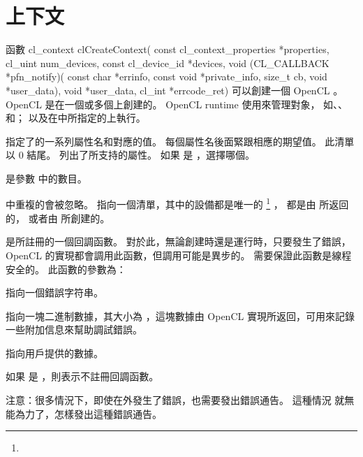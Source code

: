 \section{上下文}
函數
\startclc
cl_context clCreateContext(
		const cl_context_properties *properties,
		cl_uint num_devices,
		const cl_device_id *devices,
		void (CL_CALLBACK *pfn_notify)(
			const char *errinfo,
			const void *private_info,
			size_t cb,
			void *user_data),
		void *user_data,
		cl_int *errcode_ret)
\stopclc
可以創建一個 OpenCL 。
OpenCL 是在一個或多個上創建的。
OpenCL runtime 使用來管理對象，
如、、和；
以及在中所指定的上執行。

 指定了的一系列屬性名和對應的值。
每個屬性名後面緊跟相應的期望值。
此清單以 0 結尾。
列出了所支持的屬性。
如果  是 ，選擇哪個。

{}

 是參數  中的數目。

\startbuffer[footnoteuniquedevice]
 中重複的會被忽略。
\stopbuffer
{} 指向一個清單，其中的設備都是唯一的
\footnote{\getbuffer[footnoteuniquedevice]}
，
都是由  所返回的，
或者由  所創建的。

 是所註冊的一個回調函數。
對於此，無論創建時還是運行時，只要發生了錯誤，OpenCL 的實現都會調用此函數，但調用可能是異步的。
需要保證此函數是線程安全的。
此函數的參數為：
\startigBase
\item {} 指向一個錯誤字符串。
\item {} 指向一塊二進制數據，其大小為 ，這塊數據由 OpenCL 實現所返回，可用來記錄一些附加信息來幫助調試錯誤。
\item {} 指向用戶提供的數據。
\stopigBase

如果  是 ，則表示不註冊回調函數。

注意：很多情況下，即使在外發生了錯誤，也需要發出錯誤通告。
這種情況  就無能為力了，怎樣發出這種錯誤通告。

